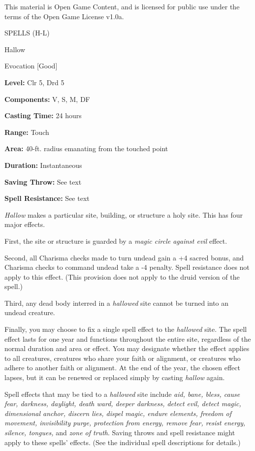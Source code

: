 \documentclass{article}
\begin{document}
This material is Open Game Content, and is licensed for public use under the terms 
of the Open Game License v1.0a.

{\LARGE{}SPELLS (H-L)}

\vspace{12pt}
Hallow

Evocation [Good]

\textbf{Level:} Clr 5, Drd 5

\textbf{Components:} V, S, M, DF

\textbf{Casting Time:} 24 hours

\textbf{Range:} Touch

\textbf{Area:} 40-ft. radius emanating from the touched point

\textbf{Duration:} Instantaneous

\textbf{Saving Throw:} See text

\textbf{Spell Resistance:} See text

\textit{Hallow }makes a particular site, building, or structure a holy site. This 
has four major effects.

First, the site or structure is guarded by a \textit{magic circle against evil 
}effect.

Second, all Charisma checks made to turn undead gain a +4 sacred bonus, and Charisma 
checks to command undead take a -4 penalty. Spell resistance does not apply to 
this effect. (This provision does not apply to the druid version of the spell.)

Third, any dead body interred in a \textit{hallowed }site cannot be turned into 
an undead creature.

Finally, you may choose to fix a single spell effect to the \textit{hallowed }site. 
The spell effect lasts for one year and functions throughout the entire site, regardless 
of the normal duration and area or effect. You may designate whether the effect 
applies to all creatures, creatures who share your faith or alignment, or creatures 
who adhere to another faith or alignment. At the end of the year, the chosen effect 
lapses, but it can be renewed or replaced simply by casting \textit{hallow }again.

Spell effects that may be tied to a \textit{hallowed }site include \textit{aid, 
bane, bless, cause fear, darkness, daylight, death ward, deeper darkness, detect 
evil, detect magic, dimensional anchor, discern lies, dispel magic, endure elements, 
freedom of movement, invisibility purge, protection from energy, remove fear, resist 
energy, silence, tongues, }and \textit{zone of truth}. Saving throws and spell 
resistance might apply to these spells' effects. (See the individual spell descriptions 
for details.)
\end{document}
